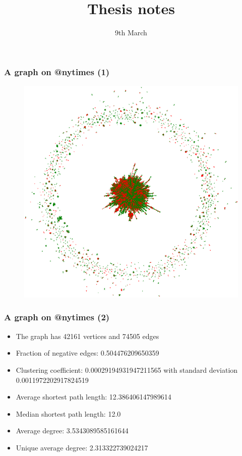 \documentclass{beamer}
\begin{document}
\title{Thesis notes}
\date{9th March}
\frame{\titlepage}

\begin{frame}[c]
    \frametitle{A graph on @nytimes (1)}
    \begin{figure}[htpb]
        \centering
        \includegraphics[width=0.8\linewidth]{img/nytimes.png}
    \end{figure}
\end{frame}

\begin{frame}[c]
    \frametitle{A graph on @nytimes (2)}
    \begin{itemize}
        \item The graph has 42161 vertices and 74505 edges
        \item Fraction of negative edges: \num{0.504476209650359}
        \item Clustering coefficient: \num{0.00029194931947211565} with
            standard deviation \num{0.0011972202917824519}
        \item Average shortest path length: \num{12.386406147989614}
        \item Median shortest path length: \num{12.0}
        \item Average degree: \num{3.5343089585161644}
        \item Unique average degree: \num{2.313322739024217}
    \end{itemize}
\end{frame}
\end{document}
